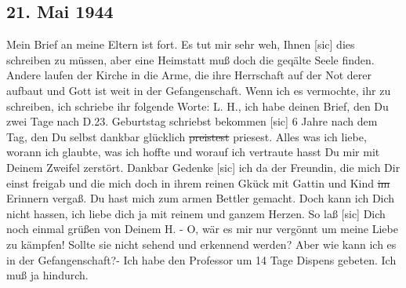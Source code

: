 \subsection{21. Mai 1944}

Mein Brief an meine Eltern ist fort.
Es tut mir sehr weh, Ihnen{\color{red} [sic] } dies schreiben zu m\"{u}ssen, aber eine Heimstatt mu{\ss} doch die geq\"{a}lte Seele finden.
Andere laufen der Kirche in die Arme, die ihre Herrschaft auf der Not derer aufbaut und Gott ist weit in der Gefangenschaft.
Wenn ich es vermochte, ihr zu schreiben, ich schriebe ihr folgende Worte: L. H., ich habe deinen Brief, den Du zwei Tage nach D.23. Geburtstag schriebst bekommen{\color{red} [sic] }
6 Jahre nach dem Tag, den Du selbst dankbar gl\"{u}cklich \st{preistest} priesest.
Alles was ich liebe, worann ich glaubte, was ich hoffte und worauf ich vertraute hasst Du mir mit Deinem Zweifel zerst\"{o}rt.
Dankbar Gedenke{\color{red} [sic] } ich da der Freundin, die mich Dir einst freigab und die mich doch in ihrem reinen Gk\"{u}ck mit Gattin und Kind \st{im} Erinnern verga{\ss}.
Du hast mich zum armen Bettler gemacht.
Doch kann ich Dich nicht hassen, ich liebe dich ja mit reinem und ganzem Herzen.
So la{\ss}{\color{red} [sic] } Dich noch einmal gr\"{u}{\ss}en von Deinem H. -
O, w\"{a}r es mir nur verg\"{o}nnt um meine Liebe zu k\"{a}mpfen!
Sollte sie nicht sehend und erkennend werden?
Aber wie kann ich es in der Gefangenschaft?-
Ich habe den Professor um 14 Tage Dispens gebeten.
Ich mu{\ss} ja hindurch.

\clearpage
